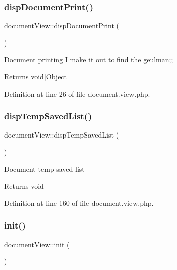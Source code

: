 \mbox{\label{classdocumentView_aab058bbbfedaeb2d9b6bb1505d5e3b9c}} 
\subsubsection{\texorpdfstring{disp\+Document\+Print()}{dispDocumentPrint()}}
{\footnotesize\ttfamily document\+View\+::disp\+Document\+Print (\begin{DoxyParamCaption}{ }\end{DoxyParamCaption})}

Document printing I make it out to find the geulman;; \begin{DoxyReturn}{Returns}
void$\vert$\+Object 
\end{DoxyReturn}


Definition at line 26 of file document.\+view.\+php.

\mbox{\label{classdocumentView_a849d0bdc714a0ea2fd23bbe86f2fde6f}} 
\subsubsection{\texorpdfstring{disp\+Temp\+Saved\+List()}{dispTempSavedList()}}
{\footnotesize\ttfamily document\+View\+::disp\+Temp\+Saved\+List (\begin{DoxyParamCaption}{ }\end{DoxyParamCaption})}

Document temp saved list \begin{DoxyReturn}{Returns}
void 
\end{DoxyReturn}


Definition at line 160 of file document.\+view.\+php.

\mbox{\label{classdocumentView_a198da8ed86ff84d45687f2783113b799}} 
\subsubsection{\texorpdfstring{init()}{init()}}
{\footnotesize\ttfamily document\+View\+::init (\begin{DoxyParamCaption}{ }\end{DoxyParamCaption})}

